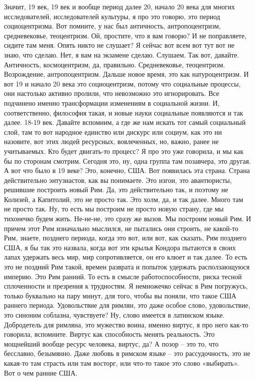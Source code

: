 Значит, 19 век, 19 век и вообще период далее 20, начало 20 века для
многих исследователей, исследователей культуры, я про это говорю, это период
социоцентризма. Вот помните, у нас был античность, антропоцентризм,
средневековье, теоцентризм. Ой, простите, что я вам говорю? И не поправляете,
сидите там меня. Опять никто не слушает? Я сейчас вот всем вот тут вот не знаю,
что сделаю. Нет, я вам на экзамене сделаю. Слушаем. Так вот, давайте.
Античность, космоцентризм, да, правильно. Средневековье, теоцентризм.
Возрождение, антропоцентризм. Дальше новое время, это как натуроцентризм. И вот
19 и начало 20 века это социоцентризм, потому что социальные процессы, они
настолько активно пролили, что невозможно это игнорировать. Все подчинено именно
трансформации изменениям в социальной жизни. И, соответственно, философия такая,
и новые науки социальные появляются и так далее. 18-19 век. Давайте вспомним, а
где же нам искать тот самый социальный слой, там то вот народное единство или
дискурс или социум, как это ни назовите, вот этих людей ресурсных, вовлеченных,
но, важно, ранее не учитываемых. Кто будет двигать-то процесс? Я про это уже
говорила, и мы как бы по сторонам смотрим. Сегодня это, ну, одна группа там
позавчера, это другая. А вот что было в 19 веке? Это, конечно, США. Вот
появилась эта страна. Страна действительно энтузиастов, как вы понимаете. Это
изгои, это авантюристы, решившие построить новый Рим. Да, это действительно так,
и поэтому не Колизей, а Капитолий, это не просто так. Это холм, да, и так далее.
Много там не просто так. Ну, то есть мы построим не просто новую страну, где мы
тихонечко будем жить. Не-не-не, это сразу же вызов. Мы построим новый Рим. И
причем этот Рим изначально мыслился, не пытались они строить, не какой-то Рим,
знаете, позднего периода, когда это вот, или вот, как сказать, Рим позднего США,
я бы так это назвала, когда вот эти крылья Кондора пытаются в своих лапах
удержать весь мир, мир сопротивляется, он его клюет и так далее. То есть это не
поздний Рим такой, времен разврата и попыток удержать расползающуюся империю.
Это Рим ранний. То есть в смысле работоспособности, риска тесной сплоченности и
презрения к трудностям. Я немножечко сейчас в Рим погружусь, только буквально на
пару минут, для того, чтобы вы поняли, что такое США раннего периода.
Удовольствие для римлян, это даже особое слово, удовольствие, это синоним
соблазна, чувствуете? Ну, слово имеется в латинском языке. Добродетель для
римляна, это мужество воина, именно виртус, я про него как-то говорила,
вспомните. Виртус как способность менять реальность. Это мощнейший вообще ресурс
человека, виртус, да? А позор – это то, что бесславно, безымянно. Даже любовь в
римском языке – это рассудочность, это не какая-то там страсть или там восторг,
или что-то такое это слово «выбирать». Вот о чем ранние США. 

